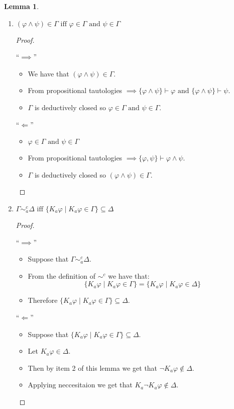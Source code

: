\documentclass[12pt]{article}
\numberwithin{equation}{section}
\theoremstyle{definition}
\newtheorem{lem}[thm]{Lemma}
\theoremstyle{definition}
\theoremstyle{remark}
\begin{document}
\begin{lem}
\begin{enumerate}
    \item $(\varphi \land \psi) \in \Gamma \text{ iff } \varphi \in \Gamma \text{ and } \psi \in \Gamma$
    \begin{proof}
    ~
    
    ``$\implies$''
    \begin{itemize}
    \item We have that $(\varphi \land \psi) \in \Gamma$.
    
    \item From propositional tautologies $\implies \{ \varphi \land \psi \} \vdash \varphi \text{ and } \{ \varphi \land \psi \} \vdash \psi$.
    
    \item $\Gamma$ is deductively closed so $\varphi \in \Gamma \text{ and } \psi \in \Gamma$.
    \end{itemize}
    ``$\Longleftarrow $''
    \begin{itemize}
    \item $\varphi \in \Gamma \text{ and } \psi \in \Gamma$
    
    \item From propositional tautologies $\implies \{ \varphi, \psi \} \vdash \varphi \land \psi $.
    
     \item $\Gamma$ is deductively closed so $(\varphi \land \psi) \in \Gamma$.
    \end{itemize}
    
    \end{proof}
    
    \item $\Gamma \sim ^c _a \Delta \text{ iff } \{ K_a\varphi \mid K_a\varphi \in \Gamma \} \subseteq \Delta$
    \begin{proof}
    ~
    
    ``$\implies$''
    \begin{itemize}
        \item Suppose that $\Gamma \sim ^c _a \Delta$.
        \item From the definition of $\sim ^c$ we have that:
        $$\{ K_a\varphi \mid K_a\varphi \in \Gamma \} = \{ K_a\varphi \mid K_a\varphi \in \Delta \}$$
        \item Therefore $\{ K_a\varphi \mid K_a\varphi \in \Gamma \} \subseteq \Delta$.
    \end{itemize}
    ``$\Longleftarrow$''
    \begin{itemize}
        \item Suppose that $\{ K_a\varphi \mid K_a\varphi \in \Gamma \} \subseteq \Delta$.
        \item Let $K_a\varphi \in \Delta$.
        \item Then by item 2 of this lemma we get that $ \neg K_a\varphi \notin \Delta$.
        \item Applying neccesitaion we get that $K_a\neg K_a\varphi \notin \Delta$.
    

\end{itemize}
\end{proof}
\end{enumerate}
\end{lem}
\end{document}
